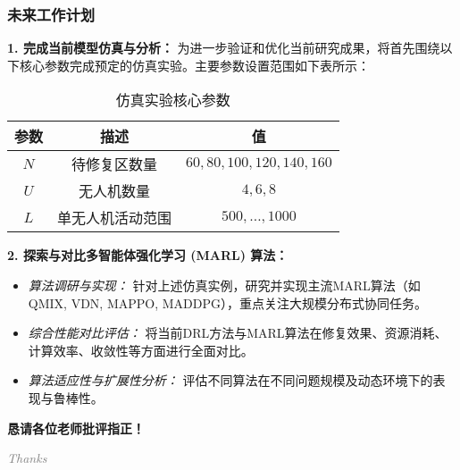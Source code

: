 \documentclass[11pt, aspectratio=169]{beamer}  %
\begin{document}
\begin{frame}
    \frametitle{未来工作计划}
    \small %
    \textbf{1. 完成当前模型仿真与分析：}
    为进一步验证和优化当前研究成果，将首先围绕以下核心参数完成预定的仿真实验。主要参数设置范围如下表所示：
    \vspace{0.5em} %
	\begin{table}[H] %
        \centering
        \caption{仿真实验核心参数}
        \setlength{\tabcolsep}{10pt}
        \begin{tabular}{ccc}
            \toprule %
            参数  & 描述       & 值                               \\
            \midrule %
            $N$ & 待修复区数量   & $60, 80, 100, 120, 140, 160$    \\
            $U$ & 无人机数量    & $4, 6, 8$                       \\
            $L$ & 单无人机活动范围 & $500, \ldots, 1000$ \\ %
            \bottomrule
        \end{tabular}
        \label{tbl_instance_setting_future_work}%
    \end{table}
    \vspace{1em}

    \textbf{2. 探索与对比多智能体强化学习 (MARL) 算法：}
    \begin{itemize}
        \item \textit{算法调研与实现：} 针对上述仿真实例，研究并实现主流MARL算法（如QMIX, VDN, MAPPO, MADDPG），重点关注大规模分布式协同任务。
        \item \textit{综合性能对比评估：} 将当前DRL方法与MARL算法在修复效果、资源消耗、计算效率、收敛性等方面进行全面对比。
        \item \textit{算法适应性与扩展性分析：} 评估不同算法在不同问题规模及动态环境下的表现与鲁棒性。
    \end{itemize}
\end{frame}



\begin{frame}
	\begin{center}
		\vspace{2cm}
		{\Huge \sffamily\bfseries\textcolor{njupt}{恳请各位老师批评指正！}} %
		\vspace{0.5cm}

		{\large \itshape\textcolor{gray}{Thanks}}
	\end{center}
\end{frame}
\end{document}
